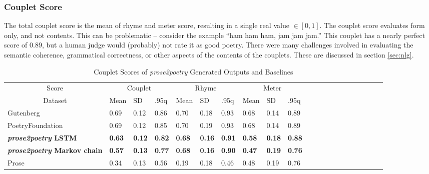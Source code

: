 \documentclass[11pt,a4paper]{article}
\begin{document}
\subsubsection{Couplet Score}
\label{sec:coupletscore}

The total couplet score is the mean of rhyme and meter score, resulting in a single real value $\in [0, 1]$.
 The couplet score evaluates form only, and not contents. This can be problematic -- consider the example ``ham ham ham, jam jam jam.'' This couplet has a nearly perfect score of 0.89, but a human judge would (probably) not rate it as good poetry. There were many challenges involved in evaluating the semantic coherence, grammatical correctness, or other aspects of the contents of the couplets. These are discussed in section \ref{sec:nlg}.

\begin{table}[ht]
\begin{tabular}{|l|l|l|l|l|l|l|l|l|l|l|c|c|c|c|c|c|c|c|c|c|}
\hline\hline
\multicolumn{1}{|c|}{Score} & \multicolumn{3}{c|}{Couplet} & \multicolumn{3}{c|}{Rhyme} & \multicolumn{3}{c|}{Meter}\\
\cline{1-10}
\multicolumn{1}{|c|}{Dataset} & Mean & SD & .95q & Mean & SD & .95q & Mean & SD & .95q \\
\hline\hline
Gutenberg & 0.69 & 0.12 & 0.86 & 0.70 & 0.18 & 0.93 & 0.68 & 0.14 & 0.89 \\ [0.5ex]
\hline
PoetryFoundation & 0.69 & 0.12 & 0.85 & 0.70 & 0.19 & 0.93 & 0.68 & 0.14 & 0.89 \\ [0.5ex]
\hline
\textbf{\textit{prose2poetry} LSTM} & \textbf{0.63} & \textbf{0.12} & \textbf{0.82} & \textbf{0.68} & \textbf{0.16} & \textbf{0.91} & \textbf{0.58} & \textbf{0.18} & \textbf{0.88} \\ [0.5ex]
\hline
\textbf{\textit{prose2poetry} Markov chain} & \textbf{0.57} & \textbf{0.13} & \textbf{0.77} & \textbf{0.68} & \textbf{0.16} & \textbf{0.90} & \textbf{0.47} & \textbf{0.19} & \textbf{0.76} \\ [0.5ex]
\hline
Prose & 0.34 & 0.13 & 0.56 & 0.19 & 0.18 & 0.46 & 0.48 & 0.19 & 0.76 \\ [0.5ex]
\hline
\end{tabular}

\caption{Couplet Scores of \textit{prose2poetry} Generated Outputs and Baselines}
\label{table:couplet_results}
\end{table}
\end{document}
